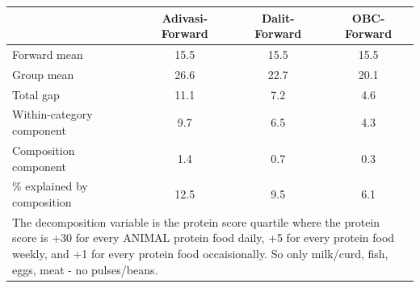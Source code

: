 \begin{tabular}{l*{3}{c}}
\hline\hline
            &\multicolumn{1}{c}{Adivasi-Forward}&\multicolumn{1}{c}{Dalit-Forward}&\multicolumn{1}{c}{OBC-Forward}\\
\hline
\hline
Forward mean&        15.5&        15.5&        15.5\\
Group mean  &        26.6&        22.7&        20.1\\
Total gap   &        11.1&         7.2&         4.6\\
Within-category component&         9.7&         6.5&         4.3\\
Composition component&         1.4&         0.7&         0.3\\
\% explained by composition&        12.5&         9.5&         6.1\\
\hline\hline
\multicolumn{4}{l}{\footnotesize \parbox[t]{0.95\linewidth}{The decomposition variable is the protein score quartile where the protein score is +30 for every ANIMAL protein food daily, +5 for every protein food weekly, and +1 for every protein food occaisionally. So only milk/curd, fish, eggs, meat - no pulses/beans.}}\\
\end{tabular}
